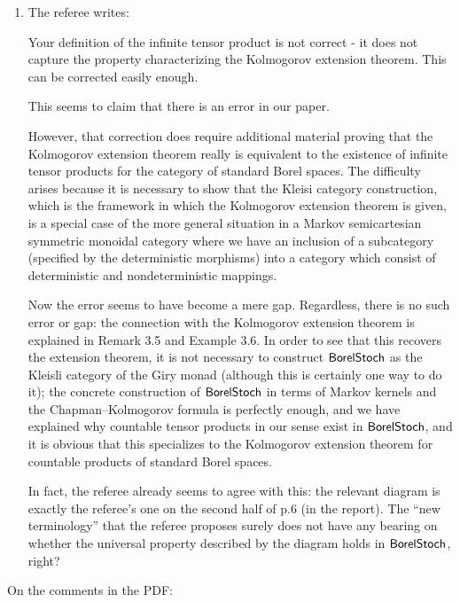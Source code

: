 \documentclass[11pt]{article}
\begin{document}
\begin{enumerate}[label=(\alph*).]
	\item The referee writes:
		\begin{displayquote}
			Your definition of the infinite tensor product is not correct - it does not capture the property characterizing the Kolmogorov extension theorem.  This can be corrected easily enough.
		\end{displayquote}
		This seems to claim that there is an error in our paper.
		\begin{displayquote}	
		However, that correction does require additional material proving that the Kolmogorov extension theorem really is equivalent to the existence of infinite tensor products for the category of standard Borel spaces. The difficulty arises because it is necessary to show that the Kleisi category construction, which is the framework in which  the Kolmogorov extension theorem is given, is a special case of the more general situation in a Markov semicartesian symmetric monoidal category where we have an inclusion of a subcategory (specified by the  deterministic morphisms) into a category which consist of deterministic and nondeterministic mappings.
		\end{displayquote}
		Now the error seems to have become a mere gap. Regardless, there is no such error or gap: the connection with the Kolmogorov extension theorem is explained in Remark 3.5 and Example 3.6. In order to see that this recovers the extension theorem, it is not necessary to construct $\operatorname{\mathsf{BorelStoch}}$ as the Kleisli category of the Giry monad (although this is certainly one way to do it); the concrete construction of $\operatorname{\mathsf{BorelStoch}}$ in terms of Markov kernels and the Chapman--Kolmogorov formula is perfectly enough, and we have explained why countable tensor products in our sense exist in $\operatorname{\mathsf{BorelStoch}}$, and it is obvious that this specializes to the Kolmogorov extension theorem for countable products of standard Borel spaces.

		In fact, the referee already seems to agree with this: the relevant diagram is exactly the referee's one on the second half of p.6 (in the report). The ``new terminology'' that the referee proposes surely does not have any bearing on whether the universal property described by the diagram holds in $\operatorname{\mathsf{BorelStoch}}$, right?
\end{enumerate}

On the comments in the PDF:
\end{document}
